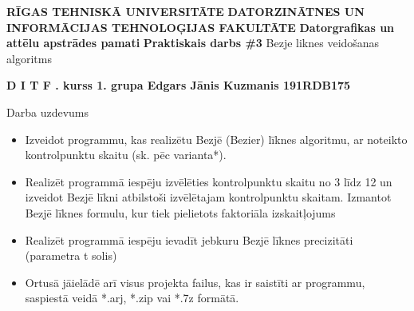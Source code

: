 \documentclass[12pt, a4]{article}
\begin{document}
	\begin{center}
	\MakeUppercase{\textbf{Rīgas TehniskĀ universitĀte}}
	\newline
	\MakeUppercase{\textbf{Datorzinātnes un informācijas tehnoloģijas fakultāte}}
	\vspace{5cm}
	\newline
	\textbf{Datorgrafikas un attēlu apstrādes pamati}
	\newline
	\textbf{Praktiskais darbs \#3}
	\newline
	Bezje liknes veidošanas algoritms
	\end{center}
\vspace{7cm}
\begin{flushright}
	\textbf{
	D I T F
	. kurss 1. grupa
	\newline
	Edgars Jānis Kuzmanis
	\newline
	191RDB175
}
\end{flushright}
\newpage
Darba uzdevums
\begin{itemize}
	\item Izveidot programmu, kas realizētu Bezjē (Bezier) līknes algoritmu, ar noteikto kontrolpunktu skaitu (sk. pēc varianta*).
	\item Realizēt programmā iespēju izvēlēties kontrolpunktu skaitu no 3 līdz 12 un izveidot Bezjē līkni atbilstoši izvēlētajam kontrolpunktu skaitam.  Izmantot Bezjē līknes formulu, kur tiek pielietots faktoriāla izskaitļojums
	\item Realizēt programmā iespēju ievadīt jebkuru Bezjē līknes precizitāti (parametra t solis)
	\item Ortusā jāielādē arī visus projekta failus, kas ir saistīti ar programmu, saspiestā veidā *.arj, *.zip vai *.7z formātā.
\end{itemize}
\end{document}
